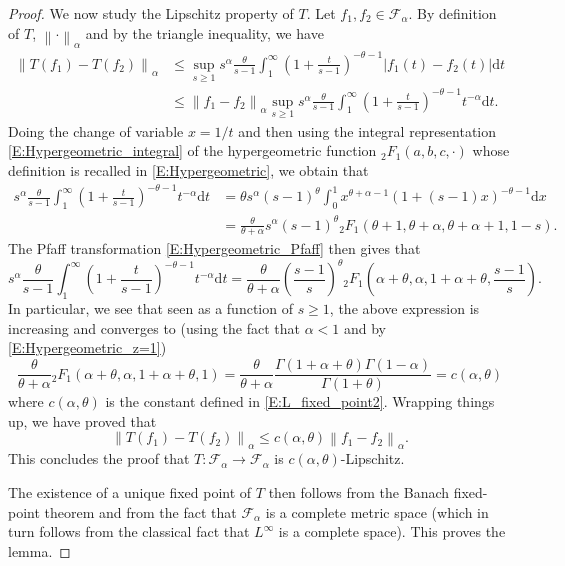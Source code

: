 \documentclass[11pt]{article}
\theoremstyle{remark}
\newcommand{\Fc}{\mathcal{F}}
\newcommand{\norme}[1]{\left\| #1 \right\| }
\renewcommand{\d}{\mathrm{d}}
\numberwithin{equation}{section}
\begin{document}
\begin{proof}
We now study the Lipschitz property of $T$.
Let $f_1, f_2 \in \Fc_\alpha$. By definition of $T$, $\norme{\cdot}_\alpha$ and by the triangle inequality, we have
\begin{align*}
\norme{T(f_1) - T(f_2)}_\alpha & \leq \sup_{s \geq 1} s^\alpha \frac{\theta}{s-1} \int_1^\infty \left( 1 + \frac{t}{s-1} \right)^{-\theta-1} |f_1(t) - f_2(t)| \d t \\
& \leq \norme{f_1 - f_2}_\alpha \sup_{s \geq 1} s^\alpha \frac{\theta}{s-1} \int_1^\infty \left( 1 + \frac{t}{s-1} \right)^{-\theta-1} t^{-\alpha} \d t.
\end{align*}
Doing the change of variable $x = 1/t$ and then using the integral representation \eqref{E:Hypergeometric_integral} of the hypergeometric function ${}_2 F_1(a,b,c,\cdot)$ whose definition is recalled in \eqref{E:Hypergeometric}, we obtain that
\begin{align*}
s^\alpha \frac{\theta}{s-1} \int_1^\infty \left( 1 + \frac{t}{s-1} \right)^{-\theta-1} t^{-\alpha} \d t
& = \theta s^\alpha (s-1)^\theta \int_0^1 x^{\theta+\alpha-1} (1 + (s-1)x)^{-\theta-1} \d x \\
& = \frac{\theta}{\theta+\alpha} s^\alpha (s-1)^\theta {}_2F_1(\theta+1,\theta+\alpha,\theta+\alpha+1,1-s).
\end{align*}
The Pfaff transformation \eqref{E:Hypergeometric_Pfaff} then gives that
\begin{equation}
\label{E:Pfaff}
s^\alpha \frac{\theta}{s-1} \int_1^\infty \left( 1 + \frac{t}{s-1} \right)^{-\theta-1} t^{-\alpha} \d t
= \frac{\theta}{\theta+\alpha} \left( \frac{s-1}{s} \right)^\theta {}_2 F_1 \left( \alpha + \theta, \alpha, 1+\alpha+\theta, \frac{s-1}{s} \right).
\end{equation}
In particular, we see that seen as a function of $s \geq 1$, the above expression is increasing and converges to (using the fact that $\alpha <1$ and by \eqref{E:Hypergeometric_z=1})
\[
\frac{\theta}{\theta+\alpha} {}_2 F_1 \left( \alpha + \theta, \alpha, 1+\alpha+\theta, 1 \right) = \frac{\theta}{\theta+\alpha} \frac{\Gamma(1+\alpha+\theta) \Gamma(1-\alpha)}{\Gamma(1+\theta)} = c(\alpha,\theta)
\]
where $c(\alpha,\theta)$ is the constant defined in \eqref{E:L_fixed_point2}. Wrapping things up, we have proved that
\[
\norme{T(f_1) - T(f_2)}_\alpha \leq c(\alpha,\theta) \norme{f_1 - f_2}_\alpha.
\]
This concludes the proof that $T : \Fc_\alpha \to \Fc_\alpha$ is $c(\alpha,\theta)$-Lipschitz.

The existence of a unique fixed point of $T$ then follows from the Banach fixed-point theorem and from the fact that $\Fc_\alpha$ is a complete metric space (which in turn follows from the classical fact that $L^\infty$ is a complete space). This proves the lemma.
\end{proof}
\end{document}
